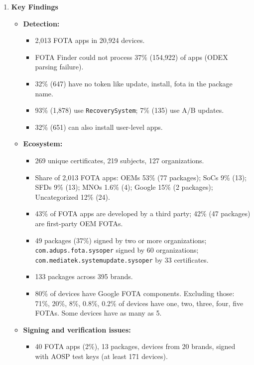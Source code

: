 \documentclass[11pt,a4paper]{article}
\newcommand{\entrypart}[1]{\textbf{\color{accent}#1}\par\vspace{2pt}}
\begin{document}
\begin{enumerate}
    \item \entrypart{Key Findings}

    \begin{itemize}[leftmargin=*,itemsep=1pt,topsep=2pt]
        \item \textbf{Detection:}
        \begin{itemize}[itemsep=0pt]
            \item 2,013 FOTA apps in 20,924 devices.
            \item FOTA Finder could not process 37\% (154,922) of apps (ODEX parsing failure).
            \item 32\% (647) have no token like update, install, fota in the package name.
            \item 93\% (1,878) use \texttt{RecoverySystem}; 7\% (135) use A/B updates.
            \item 32\% (651) can also install user-level apps.
        \end{itemize}
        \item \textbf{Ecosystem:}
        \begin{itemize}[itemsep=0pt]
            \item 269 unique certificates, 219 subjects, 127 organizations.
            \item Share of 2,013 FOTA apps: OEMs 53\% (77 packages); SoCs 9\% (13); SFDs 9\% (13); MNOs 1.6\% (4); Google 15\% (2 packages); Uncategorized 12\% (24).
            \item 43\% of FOTA apps are developed by a third party; 42\% (47 packages) are first-party OEM FOTAs.
            \item 49 packages (37\%) signed by two or more organizations; \texttt{com.adups.fota.sysoper} signed by 60 organizations; \texttt{com.mediatek.systemupdate.sysoper} by 33 certificates.
            \item 133 packages across 395 brands.
            \item 80\% of devices have Google FOTA components. Excluding those: 71\%, 20\%, 8\%, 0.8\%, 0.2\% of devices have one, two, three, four, five FOTAs. Some devices have as many as 5.
        \end{itemize}
        \item \textbf{Signing and verification issues:}
        \begin{itemize}[itemsep=0pt]
            \item 40 FOTA apps (2\%), 13 packages, devices from 20 brands, signed with AOSP test keys (at least 171 devices).

\end{itemize}
\end{itemize}
\end{enumerate}
\end{document}
